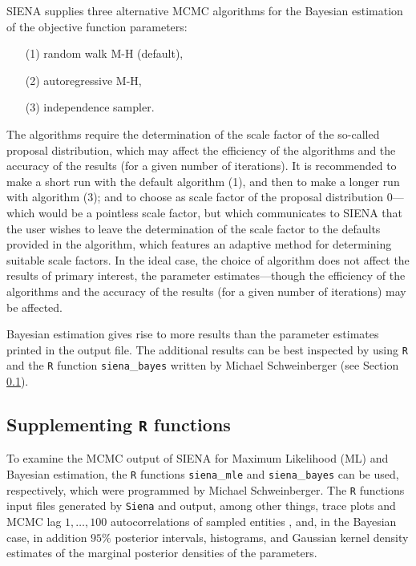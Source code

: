 \documentclass[a4paper,fleqn]{article}
\newcommand{\+}{\, + \,}
\newcommand{\SI}{{\sf SIENA }}
\begin{document}
{\SI supplies three alternative MCMC algorithms for the
Bayesian estimation of the objective function parameters:
\begin{itemize}
\item[(1)] random walk M-H (default),
\item[(2)] autoregressive M-H,
\item[(3)] independence sampler.
\end{itemize}
The algorithms require the determination of the scale factor of
the so-called proposal distribution, which may affect the efficiency
of the algorithms and the accuracy of the results (for a given number of iterations).
It is recommended to make a short run with the default algorithm (1),
and then to make a longer run with algorithm (3);
and to choose as scale factor of the proposal
distribution $0$---which would be a pointless scale factor,
but which communicates to \SI that the user wishes to
leave the determination of the scale factor to the defaults provided in the algorithm,
which features an adaptive method for determining suitable
scale factors.
In the ideal case, the choice of algorithm does not affect the
results of primary interest, the parameter estimates---though the
efficiency of the algorithms and the accuracy of the results (for a
given number of iterations) may be affected.

Bayesian estimation gives rise to more results than the parameter
estimates printed in the output file.
The additional results can be best inspected by using {\tt R} and the
{\tt R} function {\tt siena}\_{\tt bayes} written by Michael
Schweinberger (see Section \ref{R_functions}).

\begin{screen}
\newpage
\end{screen}
\begin{print}
\end{print}
\subsection{Supplementing {\tt R} functions}
\label{R_functions}

To examine the MCMC output of \SI for Maximum Likelihood (ML) and Bayesian estimation,
the {\tt R} functions {\tt siena}\_{\tt mle} and {\tt siena}\_{\tt bayes} can be used,
respectively,
which were programmed by Michael Schweinberger.
The {\tt R} functions input files generated by {\tt Siena} and output,
among other things,
trace plots and MCMC lag $1, \dots, 100$ autocorrelations of sampled entities
\citep[see][]{SchweinbergerSnijders07b, SchweinbergerSnijders07c},
and,
in the Bayesian case,
in addition $95\%$ posterior intervals, histograms, and Gaussian kernel density
estimates of the marginal posterior densities of the parameters.

}
\end{document}
